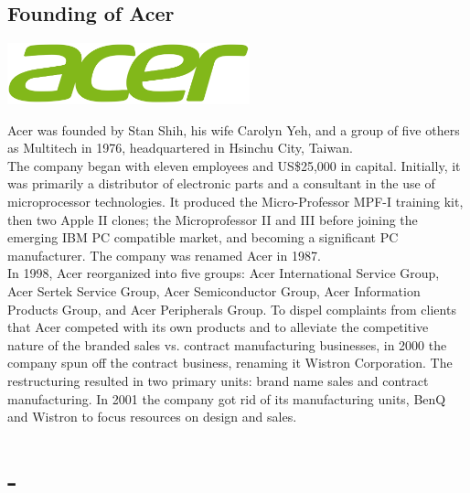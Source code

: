 \documentclass[11pt]{report}
\begin{document}
\subsection{Founding of Acer}
\vspace{2mm}\begin{center}\includegraphics[width=7cm]{./img/acerLogo.jpg}\end{center}
Acer was founded by Stan Shih, his wife Carolyn Yeh, and a group of five others as Multitech in 1976, headquartered in Hsinchu City, Taiwan.\\
\indent The company began with eleven employees and US\$25,000 in capital. Initially, it was primarily a distributor of electronic parts and a consultant in the use of microprocessor technologies. It produced the Micro-Professor MPF-I training kit, then two Apple II clones; the Microprofessor II and III before joining the emerging IBM PC compatible market, and becoming a significant PC manufacturer. The company was renamed Acer in 1987.\\
\indent In 1998, Acer reorganized into five groups: Acer International Service Group, Acer Sertek Service Group, Acer Semiconductor Group, Acer Information Products Group, and Acer Peripherals Group. To dispel complaints from clients that Acer competed with its own products and to alleviate the competitive nature of the branded sales vs. contract manufacturing businesses, in 2000 the company spun off the contract business, renaming it Wistron Corporation. The restructuring resulted in two primary units: brand name sales and contract manufacturing. In 2001 the company got rid of its manufacturing units, BenQ and Wistron to focus resources on design and sales.
\section{-}
\end{document}
